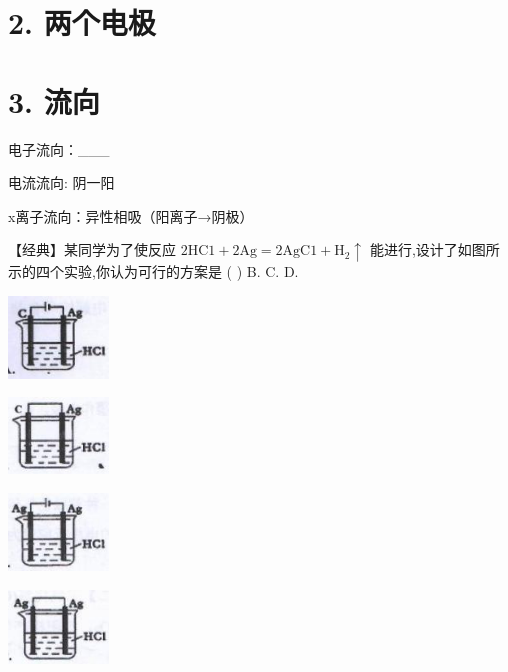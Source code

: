 \documentclass[10pt]{article}
\begin{document}
\section*{2. 两个电极}

\section*{3. 流向}

电子流向：\_\_\_

电流流向: 阴一阳

\text{\textbackslash} x离子流向：异性相吸（阳离子→阴极）

【经典】某同学为了使反应 \(2\mathrm{{HC}}1 + 2\mathrm{{Ag}} = 2\mathrm{{AgC}}1 + {\mathrm{H}}_{2} \uparrow\) 能进行,设计了如图所示的四个实验,你认为可行的方案是 ( ) B. C. D.

\begin{center}
\includegraphics[max width=0.2\textwidth]{images/0190d9a9-6e54-7ef1-97c3-2701896ca5e8_0_699548.jpg}
\end{center}

\begin{center}
\includegraphics[max width=0.2\textwidth]{images/0190d9a9-6e54-7ef1-97c3-2701896ca5e8_0_942435.jpg}
\end{center}

\begin{center}
\includegraphics[max width=0.2\textwidth]{images/0190d9a9-6e54-7ef1-97c3-2701896ca5e8_0_433745.jpg}
\end{center}

\begin{center}
\includegraphics[max width=0.2\textwidth]{images/0190d9a9-6e54-7ef1-97c3-2701896ca5e8_0_668314.jpg}
\end{center}
\end{document}

